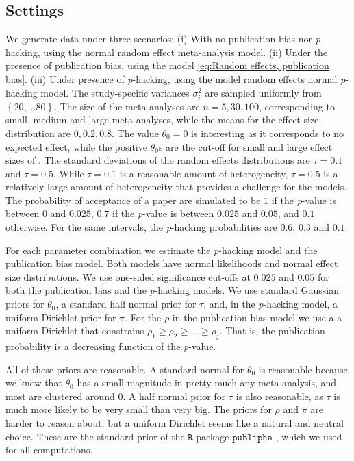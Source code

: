 \documentclass{article}
\theoremstyle{plain}
\theoremstyle{definition}
\begin{document}
\subsection{Settings}
We generate data under three scenarios: (i) With no publication bias nor \textit{p}-hacking, using the normal random effect meta-analysis model. (ii) Under the presence of publication bias, using the model \eqref{eq:Random effects, publication bias}. (iii) Under presence of \textit{p}-hacking, using the model random effects normal \textit{p}-hacking model. The study-specific variances $\sigma_{i}^{2}$ are sampled uniformly from $\left\{ 20,\ldots80\right\} $. The size of the meta-analyses are $n = 5, 30, 100$, corresponding to small, medium and large meta-analyses, while the means for the effect size distribution are $0, 0.2, 0.8$. The value $\theta_0 = 0$ is interesting as it corresponds to no expected effect, while the positive $\theta_0$s are the cut-off for small and large effect sizes of \citet[][pages 24 -- 27]{cohen1988statistical}. The standard deviations of the random effects distributions are $\tau=0.1$ and $\tau=0.5$. While $\tau = 0.1$ is a reasonable amount of heterogeneity, $\tau=0.5$ is a relatively large amount of heterogeneity that provides a challenge for the models. The probability of acceptance of a paper are simulated to be $1$ if the \textit{p}-value is between $0$ and $0.025$, $0.7$ if the \textit{p}-value is between $0.025$ and $0.05$, and $0.1$ otherwise. For the same intervals, the \textit{p}-hacking probabilities are $0.6$, $0.3$ and $0.1$.

For each parameter combination we estimate the \textit{p}-hacking model and the publication bias model. Both models have normal likelihoods and normal effect size distributions. We use one-sided significance cut-offs at $0.025$ and $0.05$ for both the publication bias and the \textit{p}-hacking models. We use standard Gaussian priors for $\theta_0$, a standard half normal prior for $\tau$, and, in the \textit{p}-hacking model, a uniform Dirichlet prior for $\pi$. For the $\rho$ in the publication bias model we use a a uniform Dirichlet that constrains $\rho_{1}\geq\rho_{2}\geq\ldots\geq\rho_{j}$. That is, the publication probability is a decreasing function of the \textit{p}-value.

All of these priors are reasonable. A standard normal for $\theta_0$ is reasonable because we know that $\theta_0$ has a small magnitude in pretty much any meta-analysis, and most are clustered around $0$. A half normal prior for $\tau$ is also reasonable, as $\tau$ is much more likely to be very small than very big. The priors for $\rho$ and $\pi$ are harder to reason about, but a uniform Dirichlet seems like a natural and neutral choice. These are the standard prior of the $\mathtt{R}$ package $\mathtt{publipha}$ \citep{publipha}, which we used for all computations.
\end{document}
